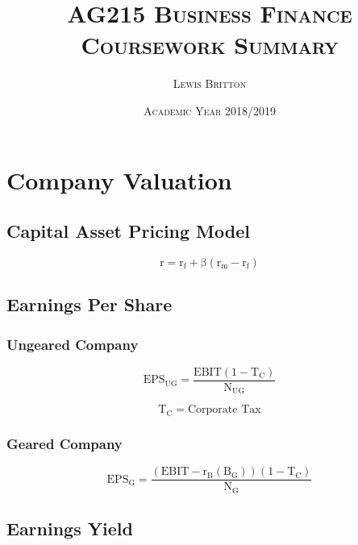 \documentclass[11pt, english]{article}
\begin{document}

	\title{\textsc{AG215 Business Finance\\ Coursework Summary}}
        \author{\textsc{Lewis Britton}}
        \date{\textsc{Academic Year 2018/2019}}
        \maketitle

\newpage


	\renewcommand{\contentsname}{Table of Contents}

        \tableofcontents

\newpage


\section{Company Valuation}

	\subsection{Capital Asset Pricing Model}

	$$\mathrm{r=r_f+\beta(r_m-r_f)}$$

	\subsection{Earnings Per Share}

		\subsubsection{Ungeared Company}

	$$\mathrm{EPS_{UG}=\frac{EBIT(1-T_C)}{N_{UG}}}$$

	$$\mathrm{T_C=\textrm{Corporate Tax}}$$

		\subsubsection{Geared Company}
	
	$$\mathrm{EPS_G=\frac{(EBIT-r_B(B_G))(1-T_C)}{N_G}}$$

	\subsection{Earnings Yield}
\end{document}
